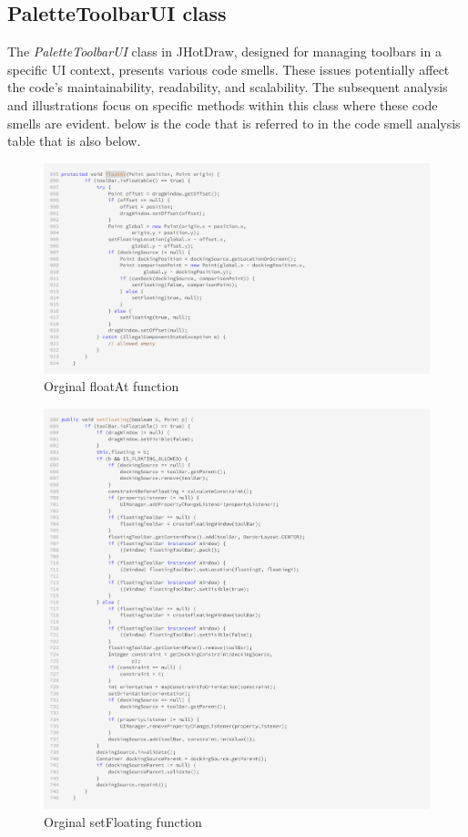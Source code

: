 \subsection{PaletteToolbarUI class}


The \textit{PaletteToolbarUI} class in JHotDraw, designed for managing toolbars in a specific UI context, presents various code smells.
These issues potentially affect the code's maintainability, readability, and scalability.
The subsequent analysis and illustrations focus on specific methods within this class where these code smells are evident.
below is the code that is referred to in the code smell analysis table that is also below.

\begin{figure}[H]
    \centering
    \includegraphics[width=\linewidth]{pic/floatAt.png}
    \caption{Orginal floatAt function}
    \label{fig:Orginal floatAt function}
\end{figure}


\begin{figure}[H]
    \centering
    \includegraphics[width=\linewidth]{pic/setFloating.png}
    \caption{Orginal setFloating function}
    \label{fig:Orginal setFloating function}
\end{figure}

